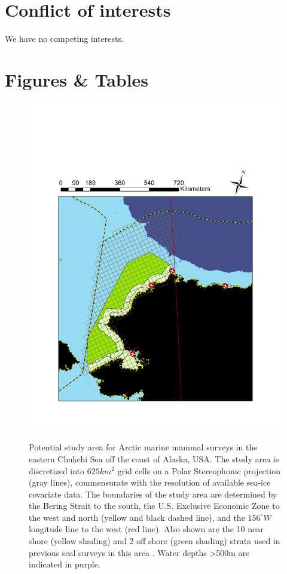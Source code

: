 \documentclass[]{rsos}%
\begin{document}
{\section*{Conflict of interests} We have no competing interests.





\section{Figures \& Tables}

\begin{figure}[ht]
\centering
\caption{Potential study area for Arctic marine mammal surveys in the eastern Chukchi Sea off the coast of Alaska, USA. The study area is discretized into $625km^2$ grid cells on a Polar Stereophonic projection (gray lines), commensurate with the resolution of available sea-ice covariate data.  The boundaries of the study area are determined by the Bering Strait to the south, the U.S. Exclusive Economic Zone to the west and north (yellow and black dashed line), and the $156^{\circ}W$ longitude line to the west (red line).  Also shown are the 10 near shore (yellow shading) and 2 off shore (green shading) strata used in previous seal surveys in this area \cite{Bengtson2005}.  Water depths >500m are indicated in purple.}
\includegraphics[width=\linewidth]{LOSI_Planning_2016}
\label{fig:Chukchi}
\end{figure}

}
\end{document}
